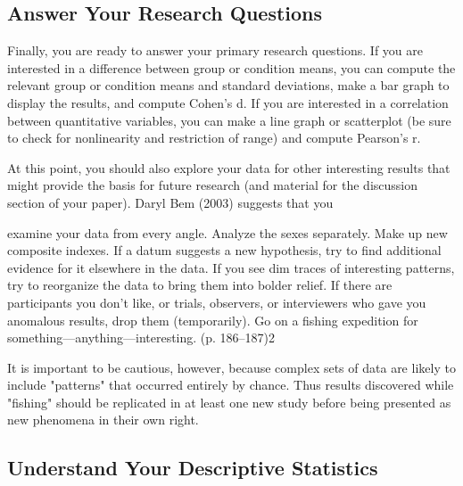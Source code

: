 \subsection{Answer Your Research Questions}

Finally, you are ready to answer your primary research questions. If you are interested in a difference between group or condition means, you can compute the relevant group or condition means and standard deviations, make a bar graph to display the results, and compute Cohen's d. If you are interested in a correlation between quantitative variables, you can make a line graph or scatterplot (be sure to check for nonlinearity and restriction of range) and compute Pearson's r.


At this point, you should also explore your data for other interesting results that might provide the basis for future research (and material for the discussion section of your paper). Daryl Bem (2003) suggests that you


examine your data from every angle. Analyze the sexes separately. Make up new composite indexes. If a datum suggests a new hypothesis, try to find additional evidence for it elsewhere in the data. If you see dim traces of interesting patterns, try to reorganize the data to bring them into bolder relief. If there are participants you don't like, or trials, observers, or interviewers who gave you anomalous results, drop them (temporarily). Go on a fishing expedition for something---anything---interesting. (p. 186–187)2


It is important to be cautious, however, because complex sets of data are likely to include "patterns" that occurred entirely by chance. Thus results discovered while "fishing" should be replicated in at least one new study before being presented as new phenomena in their own right.



\subsection{Understand Your Descriptive Statistics}


